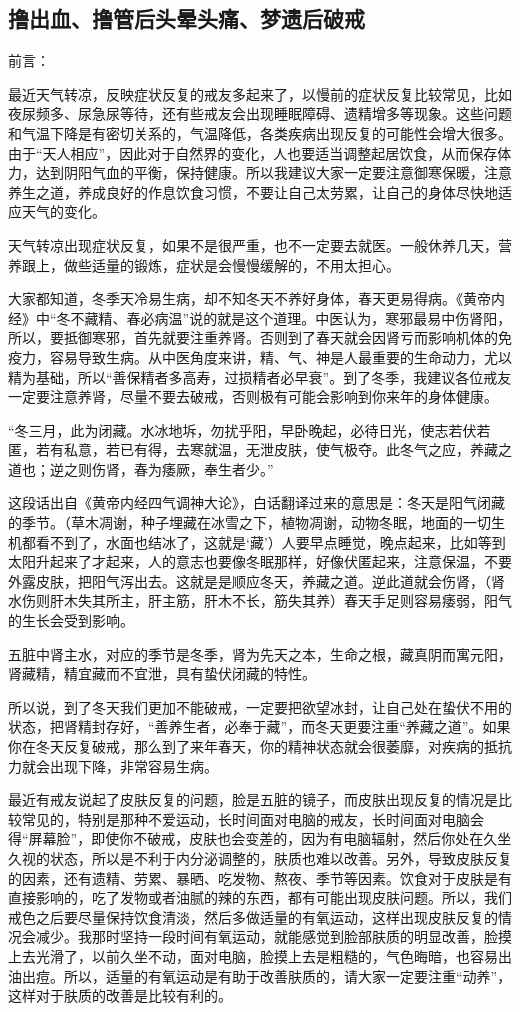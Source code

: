 \documentclass{ctexart}
\begin{document}
\subsection{撸出血、撸管后头晕头痛、梦遗后破戒}

前言：

最近天气转凉，反映症状反复的戒友多起来了，以慢前的症状反复比较常见，比如夜尿频多、尿急尿等待，还有些戒友会出现睡眠障碍、遗精增多等现象。这些问题和气温下降是有密切关系的，气温降低，各类疾病出现反复的可能性会增大很多。由于“天人相应”，因此对于自然界的变化，人也要适当调整起居饮食，从而保存体力，达到阴阳气血的平衡，保持健康。所以我建议大家一定要注意御寒保暖，注意养生之道，养成良好的作息饮食习惯，不要让自己太劳累，让自己的身体尽快地适应天气的变化。

天气转凉出现症状反复，如果不是很严重，也不一定要去就医。一般休养几天，营养跟上，做些适量的锻炼，症状是会慢慢缓解的，不用太担心。

大家都知道，冬季天冷易生病，却不知冬天不养好身体，春天更易得病。《黄帝内经》中“冬不藏精、春必病温”说的就是这个道理。中医认为，寒邪最易中伤肾阳，所以，要抵御寒邪，首先就要注重养肾。否则到了春天就会因肾亏而影响机体的免疫力，容易导致生病。从中医角度来讲，精、气、神是人最重要的生命动力，尤以精为基础，所以“善保精者多高寿，过损精者必早衰”。到了冬季，我建议各位戒友一定要注意养肾，尽量不要去破戒，否则极有可能会影响到你来年的身体健康。

“冬三月，此为闭藏。水冰地坼，勿扰乎阳，早卧晚起，必待日光，使志若伏若匿，若有私意，若已有得，去寒就温，无泄皮肤，使气极夺。此冬气之应，养藏之道也；逆之则伤肾，春为痿厥，奉生者少。”

这段话出自《黄帝内经四气调神大论》，白话翻译过来的意思是：冬天是阳气闭藏的季节。（草木凋谢，种子埋藏在冰雪之下，植物凋谢，动物冬眠，地面的一切生机都看不到了，水面也结冰了，这就是‘藏’）人要早点睡觉，晚点起来，比如等到太阳升起来了才起来，人的意志也要像冬眠那样，好像伏匿起来，注意保温，不要外露皮肤，把阳气泻出去。这就是是顺应冬天，养藏之道。逆此道就会伤肾，（肾水伤则肝木失其所主，肝主筋，肝木不长，筋失其养）春天手足则容易痿弱，阳气的生长会受到影响。

五脏中肾主水，对应的季节是冬季，肾为先天之本，生命之根，藏真阴而寓元阳，肾藏精，精宜藏而不宜泄，具有蛰伏闭藏的特性。

所以说，到了冬天我们更加不能破戒，一定要把欲望冰封，让自己处在蛰伏不用的状态，把肾精封存好，“善养生者，必奉于藏”，而冬天更要注重“养藏之道”。如果你在冬天反复破戒，那么到了来年春天，你的精神状态就会很萎靡，对疾病的抵抗力就会出现下降，非常容易生病。

最近有戒友说起了皮肤反复的问题，脸是五脏的镜子，而皮肤出现反复的情况是比较常见的，特别是那种不爱运动，长时间面对电脑的戒友，长时间面对电脑会得“屏幕脸”，即使你不破戒，皮肤也会变差的，因为有电脑辐射，然后你处在久坐久视的状态，所以是不利于内分泌调整的，肤质也难以改善。另外，导致皮肤反复的因素，还有遗精、劳累、暴晒、吃发物、熬夜、季节等因素。饮食对于皮肤是有直接影响的，吃了发物或者油腻的辣的东西，都有可能出现皮肤问题。所以，我们戒色之后要尽量保持饮食清淡，然后多做适量的有氧运动，这样出现皮肤反复的情况会减少。我那时坚持一段时间有氧运动，就能感觉到脸部肤质的明显改善，脸摸上去光滑了，以前久坐不动，面对电脑，脸摸上去是粗糙的，气色晦暗，也容易出油出痘。所以，适量的有氧运动是有助于改善肤质的，请大家一定要注重“动养”，这样对于肤质的改善是比较有利的。
\end{document}
